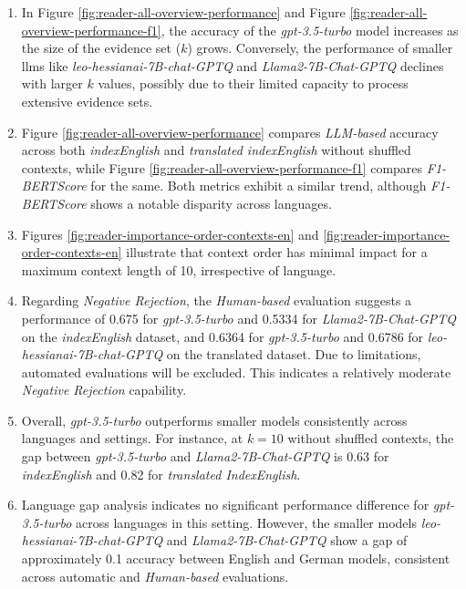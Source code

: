 \begin{enumerate}
    \item In Figure \ref{fig:reader-all-overview-performance} and Figure \ref{fig:reader-all-overview-performance-f1}, the accuracy of the \textit{gpt-3.5-turbo} model increases as the size of the evidence set ($k$) grows. Conversely, the performance of smaller \gls{llm}s like \textit{leo-hessianai-7B-chat-GPTQ} and \textit{Llama2-7B-Chat-GPTQ} declines with larger $k$ values, possibly due to their limited capacity to process extensive evidence sets.
    \item Figure \ref{fig:reader-all-overview-performance} compares \textit{LLM-based} accuracy across both \textit{indexEnglish} and \textit{translated indexEnglish} without shuffled contexts, while Figure \ref{fig:reader-all-overview-performance-f1} compares \textit{F1-BERTScore} for the same. Both metrics exhibit a similar trend, although \textit{F1-BERTScore} shows a notable disparity across languages.
    \item Figures \ref{fig:reader-importance-order-contexts-en} and \ref{fig:reader-importance-order-contexts-en} illustrate that context order has minimal impact for a maximum context length of 10, irrespective of language.
    \item Regarding \textit{Negative Rejection}, the \textit{Human-based} evaluation suggests a performance of 0.675 for \textit{gpt-3.5-turbo} and 0.5334 for \textit{Llama2-7B-Chat-GPTQ} on the \textit{indexEnglish} dataset, and 0.6364 for \textit{gpt-3.5-turbo} and 0.6786 for \textit{leo-hessianai-7B-chat-GPTQ} on the translated dataset. Due to limitations, automated evaluations will be excluded. This indicates a relatively moderate \textit{Negative Rejection} capability.
    \item Overall, \textit{gpt-3.5-turbo} outperforms smaller models consistently across languages and settings. For instance, at $k = 10$ without shuffled contexts, the gap between \textit{gpt-3.5-turbo} and \textit{Llama2-7B-Chat-GPTQ} is 0.63 for \textit{indexEnglish} and 0.82 for \textit{translated IndexEnglish}.
    \item Language gap analysis indicates no significant performance difference for \textit{gpt-3.5-turbo} across languages in this setting. However, the smaller models \textit{leo-hessianai-7B-chat-GPTQ} and \textit{Llama2-7B-Chat-GPTQ} show a gap of approximately 0.1 accuracy between English and German models, consistent across automatic and \textit{Human-based} evaluations.
\end{enumerate}

